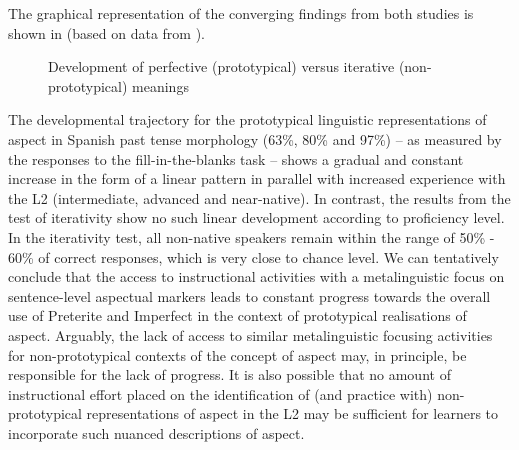 \documentclass[output=paper,modfonts,nonflat,newtxmath]{langsci/langscibook}
\begin{document}
The graphical representation of the converging findings from both studies is shown in  (based on data from \citealt{Scholes2008}).

\begin{figure}
    \caption{\label{fig:salaberry:2}Development of perfective (prototypical) versus iterative (non-prototypical) meanings}
\end{figure}


The developmental trajectory for the prototypical linguistic representations of aspect in Spanish past tense morphology (63\%, 80\% and 97\%) – as measured by the responses to the fill-in-the-blanks task – shows a gradual and constant increase in the form of a linear pattern in parallel with increased experience with the L2 (intermediate, advanced and near-native). In contrast, the results from the test of iterativity show no such linear development according to proficiency level. In the iterativity test, all non-native speakers remain within the range of 50\% - 60\% of correct responses, which is very close to chance level. We can tentatively conclude that the access to instructional activities with a metalinguistic focus on sentence-level aspectual markers leads to constant progress towards the overall use of Preterite and Imperfect in the context of prototypical realisations of aspect. Arguably, the lack of access to similar metalinguistic focusing activities for non-prototypical contexts of the concept of aspect may, in principle, be responsible for the lack of progress. It is also possible that no amount of instructional effort placed on the identification of (and practice with) non-prototypical representations of aspect in the L2 may be sufficient for learners to incorporate such nuanced descriptions of aspect.
\end{document}
